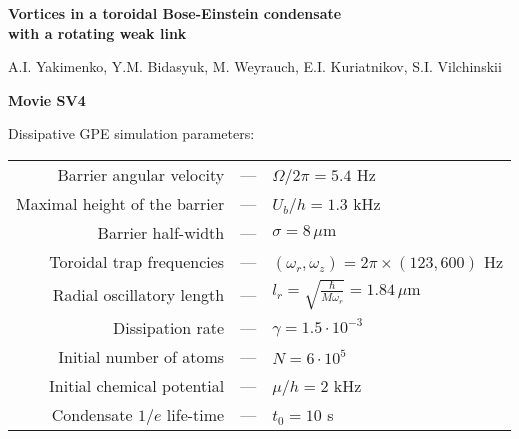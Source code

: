 \documentclass[preview]{standalone}
\begin{document}
\setcounter{page}{1}
\begin{center}
\vphantom{\rule{1pt}{15mm}}
{\large \bf Vortices in a toroidal Bose-Einstein condensate \\ with a rotating weak link}

\vspace {5mm}

{\small A.I. Yakimenko, Y.M. Bidasyuk, M. Weyrauch, E.I. Kuriatnikov, S.I. Vilchinskii}

\vspace {2mm}

{\large \textbf{Movie SV4}}

\vspace {2mm}

Dissipative GPE simulation parameters:

\vspace {5mm}

{\small \begin{tabular}{r c l}
        Barrier angular velocity   & --- & $\Omega/2\pi = 5.4$ Hz  \\
Maximal height of the barrier   & --- & $U_b / h = 1.3$ kHz \\
        Barrier half-width   & --- & $\sigma=8\,\mu\mathrm{m}$ \\
Toroidal trap frequencies  & --- & $(\omega_r,\omega_z)=2\pi\times(123,600)$ Hz \\
        Radial oscillatory length  & --- & $l_r=\sqrt{\frac{\hbar}{M\omega_r}}=1.84\,\mu\mathrm{m}$ \\	
        Dissipation rate  & --- & $\gamma=1.5\cdot 10^{-3}$ \\	
        Initial number of atoms  & --- & $N=6\cdot 10^5$ \\	
        Initial chemical potential  & --- & $\mu/h=2$ kHz \\	
        Condensate $1/e$ life-time & --- & $t_0=10$ s      
\end{tabular}
}

\end{center}
\vphantom{\rule{1pt}{10mm}}
\end{document}
